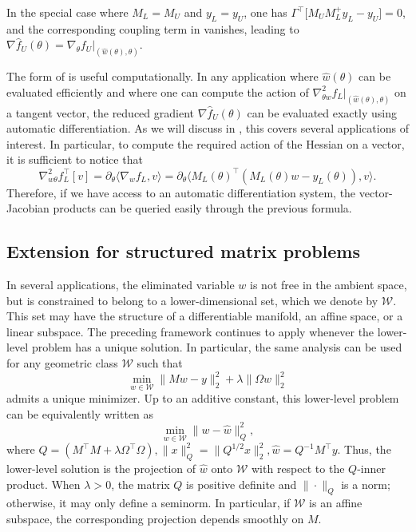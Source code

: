 \documentclass{article}
\begin{document}
In the special case where $M_L=M_U$ and $y_L=y_U$, one has
$\Gamma^\top\bigl[  M_U M_L^+y_L-y_U
   \bigr]=0$, and the corresponding coupling term in
 vanishes, leading to
$\nabla \widehat f_U(\theta) =
\nabla_\theta f_U|_{(\widehat w(\theta),\theta)}$.

The form of  is useful computationally. In any application where $\widehat w(\theta)$ can be evaluated efficiently and where one can compute the action of
$\nabla^2_{\theta w} f_L|_{(\widehat w(\theta),\theta)}$ on a tangent vector, the reduced gradient $\nabla \widehat f_U(\theta)$ can be evaluated exactly using automatic differentiation. As we will discuss in , this covers several applications of interest. In particular, to compute the required action of the Hessian on a vector, it is sufficient to notice that
\[
\nabla^2_{w \theta} f_L^\top[v] = \partial_\theta \langle \nabla_w f_L,v \rangle = \partial_{\theta} \langle M_L(\theta)^\top (M_L(\theta) w -y_L(\theta)),v \rangle .
\]
 Therefore, if we have access to an automatic differentiation system, the vector-Jacobian products can be queried easily through the previous formula. 

\subsection{Extension for structured matrix problems} \label{sec:structured_varpro}

In several applications, the eliminated variable $w$ is not free in the ambient space, but is constrained to belong to a lower-dimensional set, which we denote by $\mathscr W$. This set may have the structure of a differentiable manifold, an affine space, or a linear subspace. The preceding framework continues to apply whenever the lower-level problem has a unique solution. In particular, the same analysis can be used for any geometric class $\mathscr W$ such that
\[
    \min_{w \in \mathscr W} \|M w-y \|_2^2 + \lambda \|\Omega w \|_2^2
\]
admits a unique minimizer. Up to an additive constant, this lower-level problem can be equivalently written as
\[
    \min_{w \in \mathscr W} \|w-\widehat  w \|^2_Q,
\]
where $Q = ( M^\top M + \lambda \Omega^\top \Omega ), \| x\|_Q^2 = \| Q^{1/2} x \|_2^2, \widehat w = Q^{-1}M^\top y$.
Thus, the lower-level solution is the projection of $\widehat w$ onto $\mathscr W$ with respect to the $Q$-inner product. When $\lambda>0$, the matrix $Q$ is positive definite and $\|\cdot\|_Q$ is a norm; otherwise, it may only define a seminorm. In particular, if $\mathscr W$ is an affine subspace, the corresponding projection depends smoothly on $M$.
\end{document}
